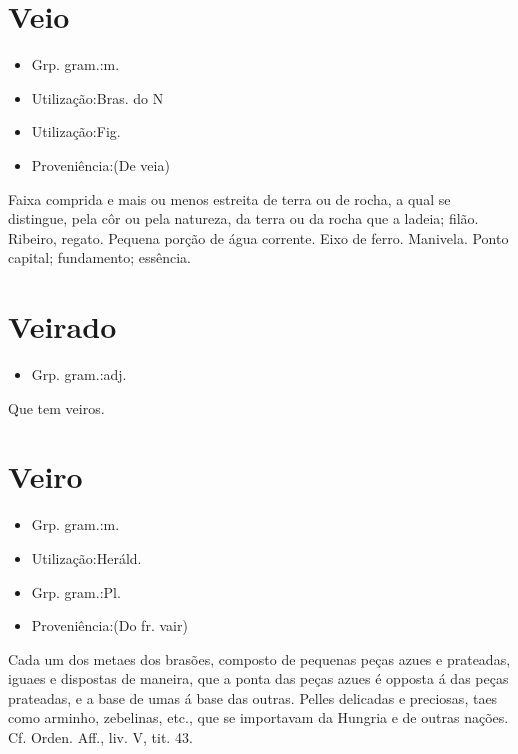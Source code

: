 \documentclass{article}
\begin{document}
\section{Veio}
\begin{itemize}
\item {Grp. gram.:m.}
\end{itemize}
\begin{itemize}
\item {Utilização:Bras. do N}
\end{itemize}
\begin{itemize}
\item {Utilização:Fig.}
\end{itemize}
\begin{itemize}
\item {Proveniência:(De \textunderscore veia\textunderscore )}
\end{itemize}
Faixa comprida e mais ou menos estreita de terra ou de rocha, a qual se distingue, pela côr ou pela natureza, da terra ou da rocha que a ladeia; filão.
Ribeiro, regato.
Pequena porção de água corrente.
Eixo de ferro.
Manivela.
Ponto capital; fundamento; essência.
\section{Veirado}
\begin{itemize}
\item {Grp. gram.:adj.}
\end{itemize}
Que tem veiros.
\section{Veiro}
\begin{itemize}
\item {Grp. gram.:m.}
\end{itemize}
\begin{itemize}
\item {Utilização:Heráld.}
\end{itemize}
\begin{itemize}
\item {Grp. gram.:Pl.}
\end{itemize}
\begin{itemize}
\item {Proveniência:(Do fr. \textunderscore vair\textunderscore )}
\end{itemize}
Cada um dos metaes dos brasões, composto de pequenas peças azues e prateadas, iguaes e dispostas de maneira, que a ponta das peças azues é opposta á das peças prateadas, e a base de umas á base das outras.
Pelles delicadas e preciosas, taes como arminho, zebelinas, etc., que se importavam da Hungria e de outras nações. Cf. \textunderscore Orden. Aff.\textunderscore , liv. V, tit. 43.
\end{document}
